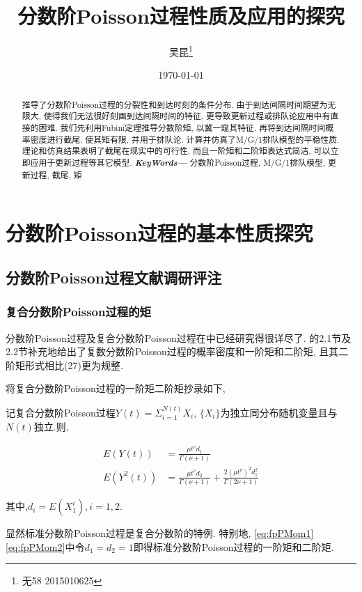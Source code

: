 \documentclass[a4paper, 12pt]{ctexart}
\begin{document}
\title{分数阶Poisson过程性质及应用的探究}
\author{吴昆\thanks{无58 2015010625}}
\providecommand{\keywords}[1]{\textbf{\textit{Index terms---}} #1}
\date{\today}
\maketitle

\begin{abstract}
推导了分数阶Poisson过程的分裂性和到达时刻的条件分布. 由于到达间隔时间期望为无限大, 使得我们无法很好刻画到达间隔时间的特征, 更导致更新过程或排队论应用中有直接的困难. 我们先利用Fubini定理推导分数阶矩, 以冀一窥其特征. 再将到达间隔时间概率密度进行截尾, 使其矩有限, 并用于排队论. 计算并仿真了M/G/1排队模型的平稳性质. 理论和仿真结果表明了截尾在现实中的可行性, 而且一阶矩和二阶矩表达式简洁, 可以立即应用于更新过程等其它模型.
\textbf{\textit{KeyWords---}} 分数阶Poisson过程, M/G/1排队模型, 更新过程, 截尾, 矩
\end{abstract}


\section{分数阶Poisson过程的基本性质探究}
\subsection{分数阶Poisson过程文献调研评注}
\subsubsection{复合分数阶Poisson过程的矩}
分数阶Poisson过程及复合分数阶Poisson过程在\cite{1}中已经研究得很详尽了. \cite{7}的2.1节及2.2节补充地给出了复数分数阶Poisson过程的概率密度和一阶矩和二阶矩, 且其二阶矩形式相比\cite{1}(27)更为规整.

将\cite{7}复合分数阶Poisson过程的一阶矩二阶矩抄录如下,

记复合分数阶Poisson过程$Y(t)=\Sigma _{i=1}^{N(t)}X_i$, $\{X_i\}$为独立同分布随机变量且与$N(t)$独立.则,

\begin{align}
E(Y(t))&=\frac{\mu t^{\nu}d_1}{\Gamma (\nu +1)} \label{eq:fpPMom1}\\
E(Y^2(t))&=\frac{\mu t^{\nu}d_2}{\Gamma (\nu +1)}+\frac{2(\mu t^{\nu})^2 d_1^2}{\Gamma(2\nu +1)}\label{eq:fpPMom2}
\end{align}

其中,$d_i=E(X_1^i), i=1,2$.

显然标准分数阶Poisson过程是复合分数阶的特例. 特别地, \eqref{eq:fpPMom1}\eqref{eq:fpPMom2}中令$d_1=d_2=1$即得标准分数阶Poisson过程的一阶矩和二阶矩.
\end{document}
